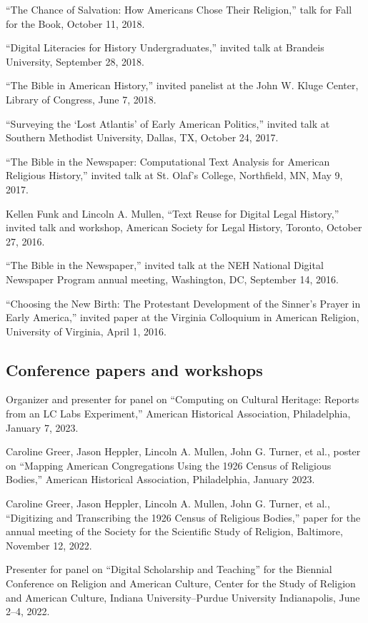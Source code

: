 \documentclass[11pt]{article}
\begin{document}
``The Chance of Salvation: How Americans Chose Their Religion,'' talk for Fall for the Book, October 11, 2018.

``Digital Literacies for History Undergraduates,'' invited talk at Brandeis University, September 28, 2018.

``The Bible in American History,'' invited panelist at the John W. Kluge Center, Library of Congress, June 7, 2018.

``Surveying the `Lost Atlantis' of Early American Politics,'' invited talk at Southern Methodist University, Dallas, TX, October 24, 2017.

``The Bible in the Newspaper: Computational Text Analysis for American Religious History,'' invited talk at St. Olaf's College, Northfield, MN, May 9, 2017.

Kellen Funk and Lincoln A. Mullen, ``Text Reuse for Digital Legal History,'' invited talk and workshop, American Society for Legal History, Toronto, October 27, 2016.

``The Bible in the Newspaper,'' invited talk at the NEH National Digital Newspaper Program annual meeting, Washington, DC, September 14, 2016.

``Choosing the New Birth: The Protestant Development of the Sinner's Prayer in Early America,'' invited paper at the Virginia Colloquium in American Religion, University of Virginia, April 1, 2016.

\subsection{Conference papers and workshops}\label{Conference papers}

Organizer and presenter for panel on ``Computing on Cultural Heritage: Reports from an LC Labs Experiment,'' American Historical Association, Philadelphia, January 7, 2023.

Caroline Greer, Jason Heppler, Lincoln A. Mullen, John G. Turner, et al., poster on ``Mapping American Congregations Using the 1926 Census of Religious Bodies,'' American Historical Association, Philadelphia, January 2023.

Caroline Greer, Jason Heppler, Lincoln A. Mullen, John G. Turner, et al., ``Digitizing and Transcribing the 1926 Census of Religious Bodies,'' paper for the annual meeting of the Society for the Scientific Study of Religion, Baltimore, November 12, 2022.

Presenter for panel on ``Digital Scholarship and Teaching'' for the Biennial Conference on Religion and American Culture, Center for the Study of Religion and American Culture, Indiana University–Purdue University Indianapolis, June 2--4, 2022.
\end{document}
